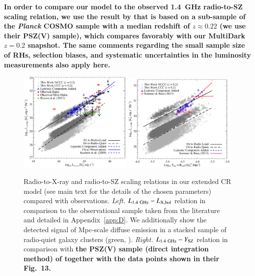 \documentclass[useAMS,usenatbib]{mn2e}
\begin{document}
{\bf In order to compare our model to the observed 1.4~GHz radio-to-SZ scaling
  relation, we use the result by \cite{2013arXiv1307.3049S} that is based on a
  sub-sample of the \emph{Planck} COSMO sample \citep{2013arXiv1303.5080P} with
  a median redshift of $z \approx 0.22$ (we use their PSZ(V) sample), which
  compares favorably with our MultiDark $z = 0.2$ snapshot. The same comments
  regarding the small sample size of RHs, selection biases, and systematic
  uncertainties in the luminosity measurements also apply here.}

\begin{figure} 
\centering
\includegraphics[width=0.49\textwidth]{figures/PL_relation.eps}
\includegraphics[width=0.49\textwidth]{figures/PSZ_relation.eps}
\caption{Radio-to-X-ray and radio-to-SZ scaling relations in our extended CR model
  (see main text for the details of the chosen parameters) compared with
  observations.  \emph{Left.} $L_{1.4~{\mathrm{GHz}}}-L_{{\mathrm{X,bol}}}$ relation in
  comparison to the observational sample taken from the literature and detailed
  in Appendix~\ref{app:D}. We additionally show the detected signal of Mpc-scale 
  diffuse emission in a stacked sample of radio-quiet galaxy clusters 
  (green, \protect\citealp{2011ApJ...740L..28B}). 
  \emph{Right.} $L_{1.4~{\mathrm{GHz}}}-Y_{{\mathrm{SZ}}}$ relation 
  in comparison with
  {\bf the PSZ(V) sample (direct integration method) 
  of \protect\cite{2013arXiv1307.3049S}
  together with the data points shown in their Fig.~13.}}
\label{fig:PLSZ}
\end{figure} 
\end{document}
